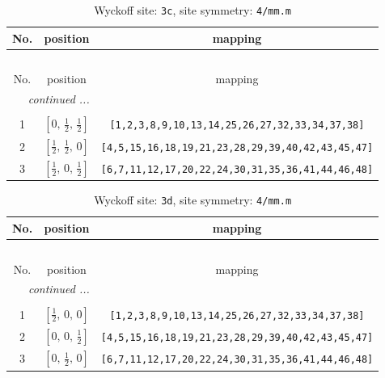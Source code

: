 \documentclass[fleqn,8pt]{jsarticle}
\begin{document}
\renewcommand{\arraystretch}{1.2}
\begin{longtable}{ccc}
\caption{Wyckoff site: {\tt 3c}, site symmetry: {\tt 4/mm.m}}
 \\
 \hline \hline
No. & position & mapping \\ \hline \endfirsthead

\multicolumn{2}{l}{\tablename\ \thetable{}} \\
 \hline \hline
No. & position & mapping \\ \hline \endhead

 \hline \hline
\multicolumn{2}{r}{\footnotesize\it continued ...} \\ \endfoot

 \hline \hline
\multicolumn{2}{r}{} \\ \endlastfoot

1 & $\left[ 0,\, \frac{1}{2},\, \frac{1}{2} \right]$ & {\tt [1,2,3,8,9,10,13,14,25,26,27,32,33,34,37,38]} \\ \hline
2 & $\left[ \frac{1}{2},\, \frac{1}{2},\, 0 \right]$ & {\tt [4,5,15,16,18,19,21,23,28,29,39,40,42,43,45,47]} \\ \hline
3 & $\left[ \frac{1}{2},\, 0,\, \frac{1}{2} \right]$ & {\tt [6,7,11,12,17,20,22,24,30,31,35,36,41,44,46,48]} \\
\end{longtable}
\renewcommand{\arraystretch}{1.2}
\begin{longtable}{ccc}
\caption{Wyckoff site: {\tt 3d}, site symmetry: {\tt 4/mm.m}}
 \\
 \hline \hline
No. & position & mapping \\ \hline \endfirsthead

\multicolumn{2}{l}{\tablename\ \thetable{}} \\
 \hline \hline
No. & position & mapping \\ \hline \endhead

 \hline \hline
\multicolumn{2}{r}{\footnotesize\it continued ...} \\ \endfoot

 \hline \hline
\multicolumn{2}{r}{} \\ \endlastfoot

1 & $\left[ \frac{1}{2},\, 0,\, 0 \right]$ & {\tt [1,2,3,8,9,10,13,14,25,26,27,32,33,34,37,38]} \\ \hline
2 & $\left[ 0,\, 0,\, \frac{1}{2} \right]$ & {\tt [4,5,15,16,18,19,21,23,28,29,39,40,42,43,45,47]} \\ \hline
3 & $\left[ 0,\, \frac{1}{2},\, 0 \right]$ & {\tt [6,7,11,12,17,20,22,24,30,31,35,36,41,44,46,48]} \\
\end{longtable}
\end{document}
